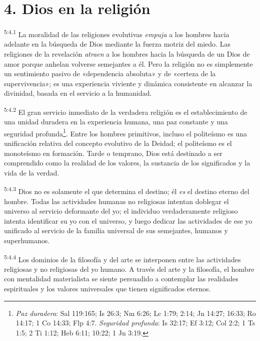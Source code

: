 \section*{4. Dios en la religión}
\par
\textsuperscript{5:4.1} La moralidad de las religiones evolutivas \textit{empuja} a los hombres hacia adelante en la búsqueda de Dios mediante la fuerza motriz del miedo. Las religiones de la revelación \textit{atraen} a los hombres hacia la búsqueda de un Dios de amor porque anhelan volverse semejantes a él. Pero la religión no es simplemente un sentimiento pasivo de «dependencia absoluta» y de «certeza de la supervivencia»; es una experiencia viviente y dinámica consistente en alcanzar la divinidad, basada en el servicio a la humanidad.

\par
\textsuperscript{5:4.2} El gran servicio inmediato de la verdadera religión es el establecimiento de una unidad duradera en la experiencia humana, una paz constante y una seguridad profunda\footnote{\textit{Paz duradera}: Sal 119:165; Is 26:3; Nm 6:26; Lc 1:79; 2:14; Jn 14:27; 16:33; Ro 14:17; 1 Co 14:33; Flp 4:7. \textit{Seguridad profunda}: Is 32:17; Ef 3:12; Col 2:2; 1 Ts 1:5; 2 Ti 1:12; Heb 6:11; 10:22; 1 Jn 3:19.}. Entre los hombres primitivos, incluso el politeísmo es una unificación relativa del concepto evolutivo de la Deidad; el politeísmo es el monoteísmo en formación. Tarde o temprano, Dios está destinado a ser comprendido como la realidad de los valores, la sustancia de los significados y la vida de la verdad.

\par
\textsuperscript{5:4.3} Dios no es solamente el que determina el destino; él \textit{es} el destino eterno del hombre. Todas las actividades humanas no religiosas intentan doblegar el universo al servicio deformante del yo; el individuo verdaderamente religioso intenta identificar su yo con el universo, y luego dedicar las actividades de ese yo unificado al servicio de la familia universal de sus semejantes, humanos y superhumanos.

\par
\textsuperscript{5:4.4} Los dominios de la filosofía y del arte se interponen entre las actividades religiosas y no religiosas del yo humano. A través del arte y la filosofía, el hombre con mentalidad materialista se siente persuadido a contemplar las realidades espirituales y los valores universales que tienen significados eternos.

